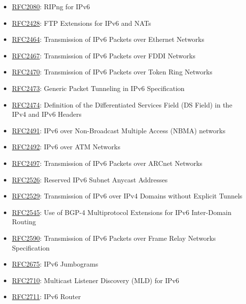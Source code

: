 \documentclass[
]{article}
\providecommand{\tightlist}{%
  \setlength{\itemsep}{0pt}\setlength{\parskip}{0pt}}
\begin{document}
\begin{itemize}
\tightlist
\item
  \href{https://www.rfc-editor.org/info/rfc2080}{RFC2080}: RIPng for
  IPv6
\item
  \href{https://www.rfc-editor.org/info/rfc2428}{RFC2428}: FTP
  Extensions for IPv6 and NATs
\item
  \href{https://www.rfc-editor.org/info/rfc2464}{RFC2464}: Transmission
  of IPv6 Packets over Ethernet Networks
\item
  \href{https://www.rfc-editor.org/info/rfc2467}{RFC2467}: Transmission
  of IPv6 Packets over FDDI Networks
\item
  \href{https://www.rfc-editor.org/info/rfc2470}{RFC2470}: Transmission
  of IPv6 Packets over Token Ring Networks
\item
  \href{https://www.rfc-editor.org/info/rfc2473}{RFC2473}: Generic
  Packet Tunneling in IPv6 Specification
\item
  \href{https://www.rfc-editor.org/info/rfc2474}{RFC2474}: Definition of
  the Differentiated Services Field (DS Field) in the IPv4 and IPv6
  Headers
\item
  \href{https://www.rfc-editor.org/info/rfc2491}{RFC2491}: IPv6 over
  Non-Broadcast Multiple Access (NBMA) networks
\item
  \href{https://www.rfc-editor.org/info/rfc2492}{RFC2492}: IPv6 over ATM
  Networks
\item
  \href{https://www.rfc-editor.org/info/rfc2497}{RFC2497}: Transmission
  of IPv6 Packets over ARCnet Networks
\item
  \href{https://www.rfc-editor.org/info/rfc2526}{RFC2526}: Reserved IPv6
  Subnet Anycast Addresses
\item
  \href{https://www.rfc-editor.org/info/rfc2529}{RFC2529}: Transmission
  of IPv6 over IPv4 Domains without Explicit Tunnels
\item
  \href{https://www.rfc-editor.org/info/rfc2545}{RFC2545}: Use of BGP-4
  Multiprotocol Extensions for IPv6 Inter-Domain Routing
\item
  \href{https://www.rfc-editor.org/info/rfc2590}{RFC2590}: Transmission
  of IPv6 Packets over Frame Relay Networks Specification
\item
  \href{https://www.rfc-editor.org/info/rfc2675}{RFC2675}: IPv6
  Jumbograms
\item
  \href{https://www.rfc-editor.org/info/rfc2710}{RFC2710}: Multicast
  Listener Discovery (MLD) for IPv6
\item
  \href{https://www.rfc-editor.org/info/rfc2711}{RFC2711}: IPv6 Router

\end{itemize}
\end{document}
